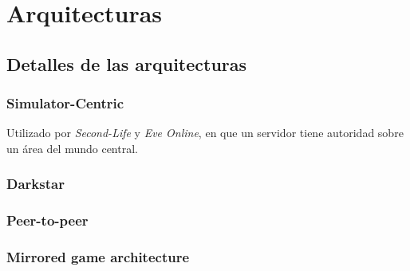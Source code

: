 \section{Arquitecturas}


\subsection{Detalles de las arquitecturas}

\subsubsection{Simulator-Centric}

Utilizado por \emph{Second-Life} y \emph{Eve Online}, en que un servidor tiene autoridad sobre un área del mundo central.

\subsubsection{Darkstar}

\subsubsection{Peer-to-peer}

\subsubsection{Mirrored game architecture}

